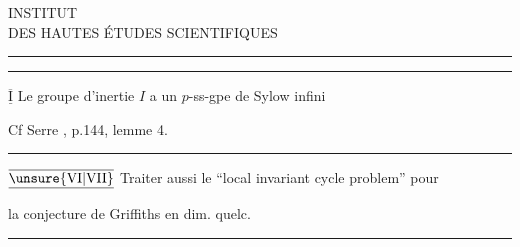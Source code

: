 \begin{center}
INSTITUT\\
DES HAUTES ÉTUDES SCIENTIFIQUES\\[-.3ex]
\rule{1.3cm}{.4pt}
\end{center}




\noindent\rule{.62\linewidth}{.4pt}

$\underline{\overline{\mathrm{I}}}$ \quad Le groupe d'inertie $I$ a un $p$-ss-gpe de Sylow infini

Cf Serre  , p.144, lemme 4.

\noindent\rule{.88\linewidth}{.4pt}

$\underline{\overline{\unsure{\mathrm{VI}|\mathrm{VII}}}}$ \quad Traiter aussi le ``local invariant cycle problem'' pour 

 la conjecture de Griffiths en dim. quelc.

\noindent\rule{.96\linewidth}{.4pt}

